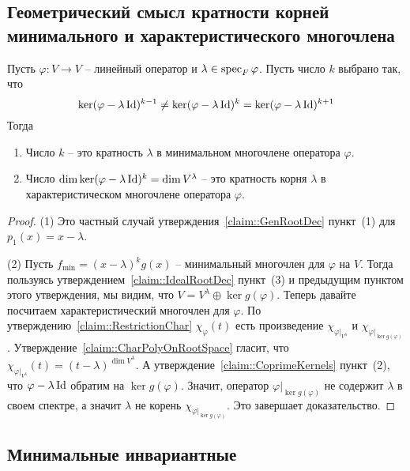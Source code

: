 \subsection{Геометрический смысл кратности корней минимального и характеристического многочлена}

\begin{claim}
\label{claim::RootMultGeom}
Пусть $\varphi\colon V \to V$ -- линейный оператор и $\lambda \in \operatorname{spec}_F \varphi$.
Пусть число $k$ выбрано так, что
\[
\ker (\varphi-\lambda\operatorname{Id})^{k-1} \neq \ker (\varphi-\lambda\operatorname{Id})^k = \ker (\varphi-\lambda\operatorname{Id})^{k+1}
\]
Тогда
\begin{enumerate}
\item Число $k$ -- это кратность $\lambda$ в минимальном многочлене оператора $\varphi$.

\item Число $\dim \ker(\varphi - \lambda \operatorname{Id})^k = \dim V^\lambda$ -- это кратность корня $\lambda$ в характеристическом многочлене оператора $\varphi$.
\end{enumerate}
\end{claim}
\begin{proof}
(1) Это частный случай утверждения~\ref{claim::GenRootDec} пункт~(1) для $p_1(x) = x-\lambda$.

(2) Пусть $f_\text{min} = (x-\lambda)^k g(x)$ -- минимальный многочлен для $\varphi$ на $V$.
Тогда пользуясь утверждением~\ref{claim::IdealRootDec} пункт~(3) и предыдущим пунктом этого утверждения, мы видим, что $V = V^\lambda \oplus \ker g(\varphi)$.
Теперь давайте посчитаем характеристический многочлен для $\varphi$.
По утверждению~\ref{claim::RestrictionChar} $\chi_\varphi(t)$ есть произведение $\chi_{\varphi|_{V^\lambda}}$ и $\chi_{\varphi|_{\ker g(\varphi)}}$.
Утверждение~\ref{claim::CharPolyOnRootSpace} гласит, что $\chi_{\varphi|_{V^\lambda}}(t) = (t - \lambda)^{\dim V^\lambda}$.
А утверждение~\ref{claim::CoprimeKernels} пункт~(2), что $\varphi - \lambda\operatorname{Id}$ обратим на $\ker g(\varphi)$.
Значит, оператор $\varphi|_{\ker g(\varphi)}$ не содержит $\lambda$ в своем спектре, а значит $\lambda$ не корень $\chi_{\varphi|_{\ker g(\varphi)}}$.
Это завершает доказательство.
\end{proof}

\subsection{Минимальные инвариантные}

